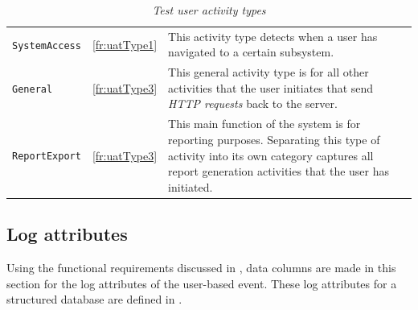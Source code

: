 \clearpage

\begin{table}[!htb]
	\centering
	\caption[Test user activity types]{\textit{Test user activity types}}
	\label{tbl:ch3_testActivityTypes}
	\begin{tabularx}{\textwidth}{llX}
		\toprule
		\thead{Activity} & \thead{Functional requirement} & \thead{Description} \\
		\midrule
		\rowcolor{lightgray}
		\texttt{SystemAccess} & \ref{fr:uatType1} & \RaggedRight This activity type detects when a user has navigated to a certain subsystem. \\ 
		\texttt{General} & \ref{fr:uatType3} & \RaggedRight This general activity type is for all other activities that the user initiates that send \textit{HTTP requests} back to the server. \\
		\rowcolor{lightgray}
		\texttt{ReportExport} & \ref{fr:uatType3} & \RaggedRight This main function of the system is for reporting purposes. Separating this type of activity into its own category captures all report generation activities that the user has initiated. \\ 
		\bottomrule
	\end{tabularx}
\end{table}

\subsection{Log attributes}\label{sec:ch3_implementationLogAtrributes}
Using the functional requirements discussed in , data columns are made in this section for the log attributes of the user-based event. These log attributes for a structured database are defined in . 

